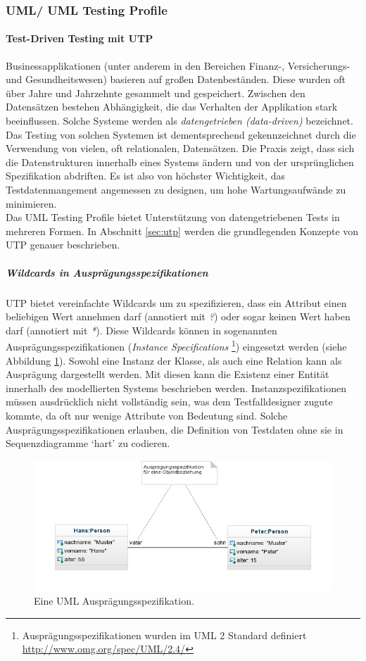 \subsubsection{UML/ UML Testing Profile}
\paragraph{Test-Driven Testing mit UTP} 
Businessapplikationen (unter anderem in den Bereichen Finanz-, Versicherungs- und Gesundheitswesen) basieren auf großen Datenbeständen. Diese wurden oft über Jahre und Jahrzehnte gesammelt und gespeichert. Zwischen den Datensätzen bestehen Abhängigkeit, die das Verhalten der Applikation stark beeinflussen. Solche Systeme werden als \textit{datengetrieben (data-driven)} bezeichnet. Das Testing von solchen Systemen ist dementsprechend gekennzeichnet durch die Verwendung von vielen, oft relationalen, Datensätzen. Die Praxis zeigt, dass sich die Datenstrukturen innerhalb eines Systems ändern und von der ursprünglichen Spezifikation abdriften. Es ist also von höchster Wichtigkeit, das Testdatenmangement angemessen zu designen, um hohe Wartungsaufwände zu minimieren. \cite{baker_model-driven_2005}\\
Das UML Testing Profile bietet Unterstützung von datengetriebenen Tests in mehreren Formen. In Abschnitt \ref{sec:utp} werden die grundlegenden Konzepte von UTP genauer beschrieben.

\subparagraph{Wildcards in Ausprägungsspezifikationen}
UTP bietet vereinfachte Wildcards um zu spezifizieren, dass ein Attribut einen beliebigen Wert annehmen darf (annotiert mit \textit{?}) oder sogar keinen Wert haben darf (annotiert mit \textit{*}). Diese Wildcards können in sogenannten Ausprägungsspezifikationen (\textit{Instance Specifications} \footnote{Ausprägungsspezifikationen wurden im UML 2 Standard definiert \url{http://www.omg.org/spec/UML/2.4/} }) eingesetzt werden (siehe Abbildung \ref{fig:uml_instance}). Sowohl eine Instanz der Klasse, als auch eine Relation kann als Ausprägung dargestellt werden. Mit diesen kann die Existenz einer Entität innerhalb des modellierten Systems beschrieben werden. Instanzspezifikationen müssen ausdrücklich nicht vollständig sein, was dem  Testfalldesigner zugute kommte, da oft nur wenige Attribute von Bedeutung sind. Solche Ausprägungsspezifikationen erlauben, die Definition von Testdaten ohne sie in Sequenzdiagramme `hart' zu codieren.
 
\begin{figure}[h] 
  \centering
     \includegraphics[width=1.0\textwidth]{figures/uml_instance.jpeg}
  \caption{Eine UML Ausprägungsspezifikation.}
  \label{fig:uml_instance}
\end{figure}


